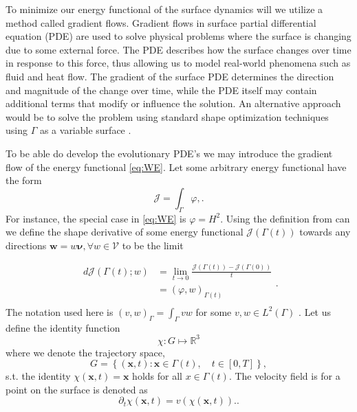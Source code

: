 To minimize our energy functional of the surface dynamics will we utilize a method called gradient flows. Gradient flows in surface partial differential equation (PDE) are used to solve physical problems where the surface is changing due to some external force. The PDE describes how the surface changes over time in response to this force, thus allowing us to model real-world phenomena such as fluid and heat flow. The gradient of the surface PDE determines the direction and magnitude of the change over time, while the PDE itself may contain additional terms that modify or influence the solution. \cite{dogan2007discrete} An alternative approach would be to solve the problem using standard shape optimization techniques using $\Gamma$ as a variable surface \cite{dalphin2014study}.

To be able do develop the evolutionary PDE's we may introduce the gradient flow of the energy functional \eqref{eq:WE}. Let some arbitrary energy functional have the form
\[
\mathcal{J} = \int_{\Gamma }^{} \varphi,.
\]
For instance, the special case in \eqref{eq:WE} is $\varphi = H ^2$.
Using the definition from \cite{bonito2010parametric, troltzsch2010optimal} can we define the shape derivative of some energy
functional $\mathcal{J} \left( \Gamma \left( t \right)  \right)  $ towards any directions $\mathbf{w} = w\boldsymbol{\nu }, \forall w \in \mathcal{V}  $  to be the limit

\begin{equation*}
    \begin{split}
d\mathcal{J} \left( \Gamma \left( t \right) ; w  \right)  & = \lim_{t \to 0} \frac{\mathcal{J}\left( \Gamma \left( t \right)  \right) - \mathcal{J} (  \Gamma \left( 0 \right))}{t} \\
&= \left(  \varphi ,w\right)_{\Gamma \left( t \right) }  \\
    \end{split}
.\end{equation*}
The notation used here is $\left( v,w \right)_{\Gamma } = \int_{\Gamma }^{}  vw   $ for some $ v,w \in L^{2}\left( \Gamma \right) $ .
Let us define the identity function $$\chi: G \mapsto  \mathbb{R} ^{3}$$ where we denote the trajectory space,
$$G = \left\{ \left( \mathbf{x},t \right) : \mathbf{x} \in \Gamma \left( t \right), \quad t \in \left[ 0,T \right]   \right\},  $$
s.t. the
identity $\chi \left( \mathbf{x},t \right)
= \mathbf{x} $ holds for all $  x \in \Gamma \left( t \right) $.
The velocity field is for a point on the surface is denoted as
\begin{equation}
\label{eq:vel}
\partial _{t} \chi \left( \mathbf{x},t \right) = v\left( \chi \left( \mathbf{x},t \right)  \right).
.\end{equation}

